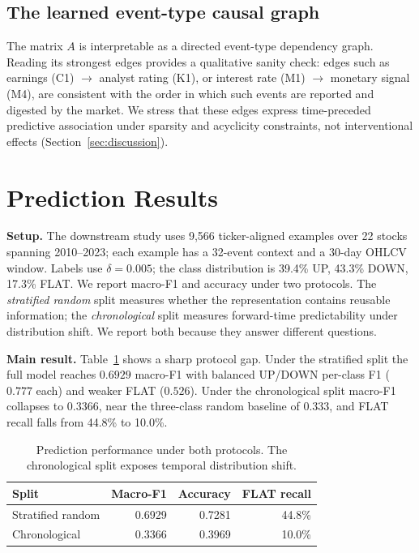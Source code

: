 \documentclass[sigconf,nonacm]{acmart}
\begin{document}
\subsection{The learned event-type causal graph}
The matrix $A$ is interpretable as a directed event-type dependency
graph. Reading its strongest edges provides a qualitative sanity check:
edges such as earnings (C1) $\rightarrow$ analyst rating (K1), or
interest rate (M1) $\rightarrow$ monetary signal (M4), are consistent
with the order in which such events are reported and digested by the
market. We stress that these edges express time-preceded predictive
association under sparsity and acyclicity constraints, not interventional
effects (Section~\ref{sec:discussion}).

\section{Prediction Results}
\label{sec:results}
\textbf{Setup.} The downstream study uses 9{,}566 ticker-aligned examples
over 22 stocks spanning 2010--2023; each example has a 32-event context
and a 30-day OHLCV window. Labels use $\delta=0.005$; the class
distribution is 39.4\% UP, 43.3\% DOWN, 17.3\% FLAT. We report macro-F1
and accuracy under two protocols. The \emph{stratified random} split
measures whether the representation contains reusable information; the
\emph{chronological} split measures forward-time predictability under
distribution shift. We report both because they answer different
questions.

\textbf{Main result.} Table~\ref{tab:main} shows a sharp protocol gap.
Under the stratified split the full model reaches $0.6929$ macro-F1 with
balanced UP/DOWN per-class F1 ($0.777$ each) and weaker FLAT
($0.526$). Under the chronological split macro-F1 collapses to $0.3366$,
near the three-class random baseline of $0.333$, and FLAT recall falls
from 44.8\% to 10.0\%.

\begin{table}[t]
\caption{Prediction performance under both protocols. The chronological
split exposes temporal distribution shift.}
\label{tab:main}
\begin{tabular}{lrrr}
\toprule
Split & Macro-F1 & Accuracy & FLAT recall \\
\midrule
Stratified random & 0.6929 & 0.7281 & 44.8\% \\
Chronological     & 0.3366 & 0.3969 & 10.0\% \\
\bottomrule
\end{tabular}
\end{table}
\end{document}
